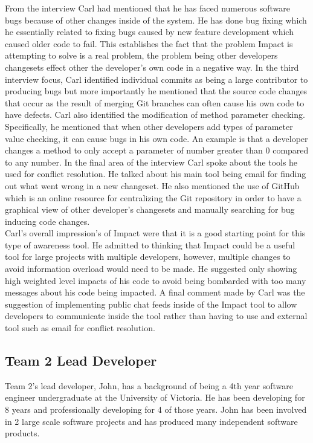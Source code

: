 \documentclass[conference]{IEEEtran}
\begin{document}
From the interview Carl had mentioned that he has faced numerous software bugs because of other changes
inside of the system. He has done bug fixing which he essentially related to fixing bugs caused by new
feature development which caused older code to fail. This establishes the fact that the problem Impact
is attempting to solve is a real problem, the problem being other developers changesets effect other the
developer's own code in a negative way. In the third interview focus, Carl identified individual commits
as being a large contributor to producing bugs but more importantly he mentioned that the source code
changes that occur as the result of merging Git branches can often cause his own code to have defects.
Carl also identified the modification of method parameter checking. Specifically, he mentioned that when
other developers add types of parameter value checking, it can cause bugs in his own code. An example is
that a developer changes a method to only accept a parameter of number greater than 0 compared to any
number. In the final area of the interview Carl spoke about the tools he used for conflict resolution. He
talked about his main tool being email for finding out what went wrong in a new changeset. He also
mentioned the use of GitHub which is an online resource for centralizing the Git repository in order
to have a graphical view of other developer's changesets and manually searching for bug inducing 
code changes.\\ 

Carl's overall impression's of Impact were that it is a good starting point for this type of awareness tool.
He admitted to thinking that Impact could be a useful tool for large projects with multiple developers, however,
multiple changes to avoid information overload would need to be made. He suggested only showing
high weighted level impacts of his code to avoid being bombarded with too many messages about his code
being impacted. A final comment made by Carl was the suggestion of implementing public chat feeds
inside of the Impact tool to allow developers to communicate inside the tool rather than having to use
and external tool such as email for conflict resolution.\\

\subsection{Team 2 Lead Developer}
Team 2's lead developer, John, has a background of being a 4th year software engineer undergraduate
at the University of Victoria. He has been developing for 8 years and professionally developing for
4 of those years. John has been involved in 2 large scale software projects and has produced
many independent software products.\\
\end{document}
